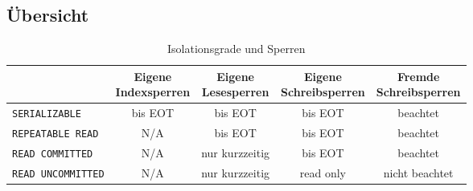 \documentclass[a4paper, 11pt, accentcolor = tud3b]{tudreport}
\begin{document}
            \subsection{Übersicht} %
            	\begin{table}[H]
            		\centering
            		\begin{tabular}{l | c | c | c | c}
            			                             & \makecell{Eigene \\ Indexsperren} & \makecell{Eigene \\ Lesesperren} & \makecell{Eigene \\ Schreibsperren} & \makecell{Fremde \\ Schreibsperren} \\ \hline
            			\lstinline|SERIALIZABLE|     & bis EOT                           & bis EOT                          & bis EOT                             & beachtet                            \\
            			\lstinline|REPEATABLE READ|  & N/A                               & bis EOT                          & bis EOT                             & beachtet                            \\
            			\lstinline|READ COMMITTED|   & N/A                               & nur kurzzeitig                   & bis EOT                             & beachtet                            \\
            			\lstinline|READ UNCOMMITTED| & N/A                               & nur kurzzeitig                   & read only                           & nicht beachtet
            		\end{tabular}
            		\caption{Isolationsgrade und Sperren}
	            \end{table}
\end{document}

